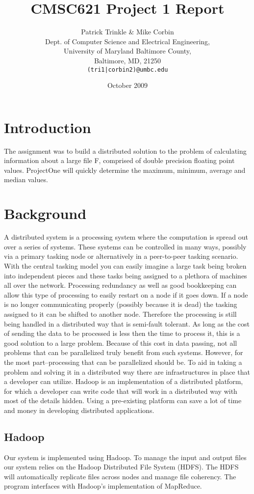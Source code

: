 \documentclass[11pt]{article}
\title{CMSC621 Project 1 Report}
\author{Patrick Trinkle \& Mike Corbin\\
Dept. of Computer Science and Electrical Engineering,\\
University of Maryland Baltimore County,\\
Baltimore, MD, 21250\\
\texttt{(tri1|corbin2)@umbc.edu}}
\date{October 2009}
\begin{document}
\maketitle

\section{Introduction}
The assignment was to build a distributed solution to the problem of calculating information about a large file F, comprised of double precision floating point values.  ProjectOne will quickly determine the maximum, minimum, average and median values.

\section{Background}
A distributed system is a processing system where the computation is spread out over a series of systems.  These systems can be controlled in many ways, possibly via a primary tasking node or alternatively in a peer-to-peer tasking scenario.  With the central tasking model you can easily imagine a large task being broken into independent pieces and these tasks being assigned to a plethora of machines all over the network.  Processing redundancy as well as good bookkeeping can allow this type of processing to easily restart on a node if it goes down.  If a node is no longer communicating properly (possibly because it is dead) the tasking assigned to it can be shifted to another node.  Therefore the processing is still being handled in a distributed way that is semi-fault tolerant.  As long as the cost of sending the data to be processed is less then the time to process it, this is a good solution to a large problem.  Because of this cost in data passing, not all problems that can be parallelized truly benefit from such systems.  However, for the most part--processing that can be parallelized should be.  To aid in taking a problem and solving it in a distributed way there are infrastructures in place that a developer can utilize.  Hadoop is an implementation of a distributed platform, for which a developer can write code that will work in a distributed way with most of the details hidden.  Using a pre-existing platform can save a lot of time and money in developing distributed applications.

\subsection*{Hadoop}
Our system is implemented using Hadoop.  To manage the input and output files our system relies on the Hadoop Distributed File System (HDFS).  The HDFS will automatically replicate files across nodes and manage file coherency.  The program interfaces with Hadoop's implementation of MapReduce.
\end{document}
